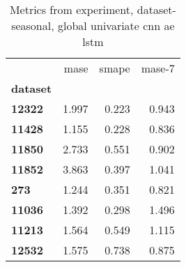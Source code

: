 \begin{table}[h]
\centering
\caption{Metrics from experiment, dataset-seasonal, global univariate cnn ae lstm}
\label{table:global-univariate-cnn-ae-lstm-dataset-seasonal}
\begin{tabular}{lrrr}
\toprule
{} &   mase &  smape &  mase-7 \\
\textbf{dataset} &        &        &         \\
\midrule
\textbf{12322  } &  1.997 &  0.223 &   0.943 \\
\textbf{11428  } &  1.155 &  0.228 &   0.836 \\
\textbf{11850  } &  2.733 &  0.551 &   0.902 \\
\textbf{11852  } &  3.863 &  0.397 &   1.041 \\
\textbf{273    } &  1.244 &  0.351 &   0.821 \\
\textbf{11036  } &  1.392 &  0.298 &   1.496 \\
\textbf{11213  } &  1.564 &  0.549 &   1.115 \\
\textbf{12532  } &  1.575 &  0.738 &   0.875 \\
\bottomrule
\end{tabular}
\end{table}
